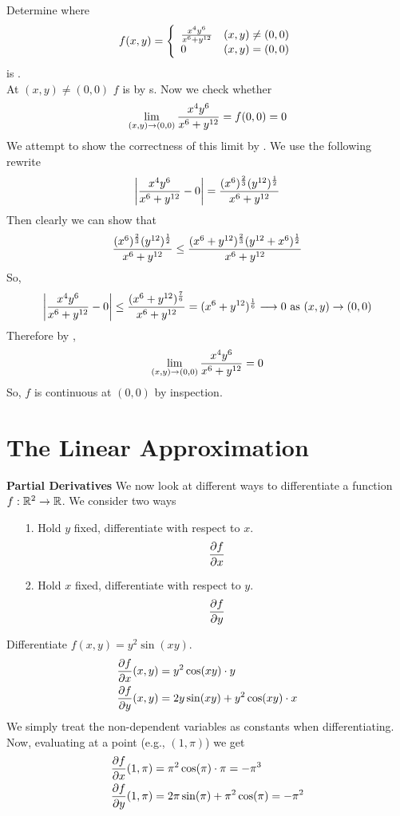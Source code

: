 \documentclass[english, 11pt]{article}
\begin{document}
  \begin{exmp}
    Determine where
    \[ f(x,y) = \left\{ \begin{array}{lr} \frac{x^4y^6}{x^6+y^{12}} & \mbox{$(x,y) \not = (0,0)$} \\ 0 & \mbox{$(x,y) = (0,0)$} \end{array} \right. \]
    is . \\ At $(x,y) \not = (0,0)$ $f$ is  by s. Now we check whether
    \[ \lim_{(x,y) \rightarrow (0,0)} \frac{x^4y^6}{x^6+y^{12}} = f(0,0) = 0 \]
    We attempt to show the correctness of this limit by . We use the following rewrite
  \[  \left| \frac{x^4y^6}{x^6+y^{12}} - 0 \right| = \frac{(x^6)^{\frac{2}{3}}(y^{12})^{\frac{1}{2}}}{x^6+y^{12}} \]
  Then clearly we can show that
  \[  \frac{(x^6)^{\frac{2}{3}}(y^{12})^{\frac{1}{2}}}{x^6+y^{12}} \leq \frac{(x^6+y^{12})^{\frac{2}{3}}(y^{12}+x^{6})^{\frac{1}{2}}}{x^6 + y^{12}} \]
  So,
  \[  \left| \frac{x^4y^6}{x^6+y^{12}} - 0 \right| \leq \frac{(x^6 + y^{12} )^{\frac{7}{6}}}{x^6 + y^{12}} = (x^6 + y^{12})^{\frac{1}{6}} \longrightarrow 0 \mbox {\ as $(x,y) \rightarrow (0,0)$} \]
  Therefore by ,
  \[ \lim_{(x,y) \rightarrow (0,0)} \frac{x^4y^6}{x^6+y^{12}} = 0  \]
  So, $f$ is continuous at $(0,0)$ by inspection.
  \end{exmp}


  \section{The Linear Approximation}

  \textbf{Partial Derivatives}
  We now look at different ways to differentiate a function $f : {\mathbb{R}}^2 \rightarrow {\mathbb{R}}$. We consider two ways
  \begin{itemize}
    \item[1.] Hold $y$ fixed, differentiate with respect to $x$.
    \[ \frac{\partial f}{\partial x} \]
    \item[2.]  Hold $x$ fixed, differentiate with respect to $y$.
    \[ \frac{\partial f}{\partial y} \]
  \end{itemize}
  \begin{exmp}
    Differentiate $f(x,y) = y^2\sin(xy)$.
    \begin{align*}
      \frac{\partial f}{\partial x}(x,y) & = y^2 \cos (xy) \cdot y \\
      \frac{\partial f}{\partial y}(x,y) & = 2y\sin(xy) + y^2\cos(xy)\cdot x
    \end{align*}
    We simply treat the non-dependent variables as constants when differentiating. Now, evaluating at a point (e.g., $(1,\pi)$) we get
    \begin{align*}
      \frac{\partial f}{\partial x}(1,\pi) & = \pi^2 \cos (\pi) \cdot \pi = -\pi^3\\
      \frac{\partial f}{\partial y}(1,\pi) & = 2\pi\sin(\pi) + \pi^2\cos(\pi) = - \pi^2
    \end{align*}
  \end{exmp}
\end{document}
